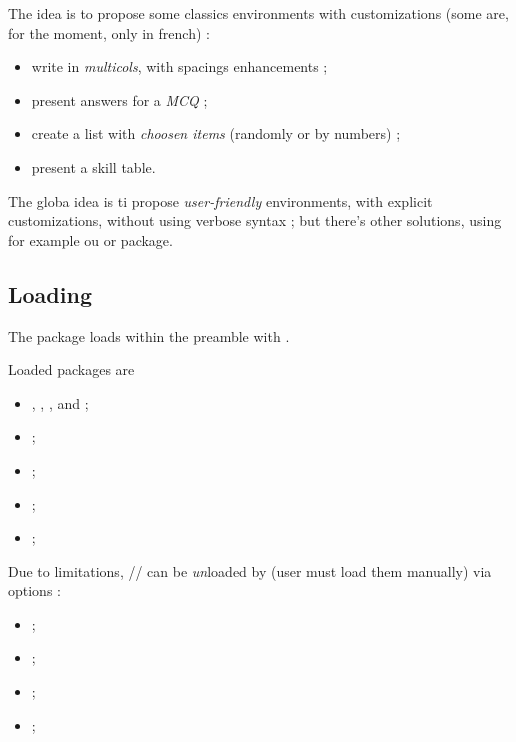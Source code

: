 \documentclass[english,11pt,a4paper]{article}
\begin{document}
The idea is to propose some classics environments with customizations (some are, for the moment, only in french) :

\begin{itemize}
	\item write in \textit{multicols}, with spacings enhancements ;
	\item present answers for a \textit{MCQ} ;
	\item create a list with \textit{choosen items} (randomly or by numbers) ;
	\item present a skill table.
\end{itemize}

\smallskip

The globa idea is ti propose \textit{user-friendly} environments, with explicit customizations, without using verbose syntax ; but there's other solutions, using for example  ou  or  package.

\subsection{Loading}

The package loads within the preamble with .

Loaded packages are 

\begin{itemize}
	\item {}, , ,  and  ;
	\item {} ;
	\item {} ;
	\item {} ;
	\item {} ;
\end{itemize}

Due to limitations, // can be \textit{un}loaded by  (user must load them manually) via options :

\begin{itemize}
	\item {} ;
	\item {} ;
	\item {} ;
	\item {} ;
\end{itemize}
\end{document}
